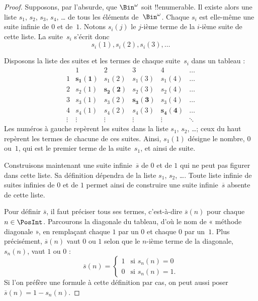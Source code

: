 \documentclass[../../../include/open-logic-section]{subfiles}
\begin{document}
\begin{proof}
Supposons, par l’absurde, que $\Bin^\omega$ soit !!{enumerable}.
Il existe alors une liste $s_{1}$, $s_{2}$, $s_{3}$, $s_{4}$, \dots{}
de tous les éléments de~$\Bin^\omega$. Chaque $s_i$ est elle-même
une suite infinie de $0$ et de~$1$. Notons $s_i(j)$ le $j$-ième terme
de la $i$-ième suite de cette liste. La suite~$s_i$ s’écrit donc
\[
s_i(1), s_i(2), s_i(3), \dots
\]

Disposons la liste des suites et les termes de chaque suite~$s_i$
dans un tableau :
\[
\begin{array}{c|c|c|c|c|c}
& 1 & 2 & 3 & 4 & \dots \\\hline
1 & \mathbf{s_{1}(1)} & s_{1}(2) & s_{1}(3) & s_1(4) & \dots \\\hline
2 & s_{2}(1)& \mathbf{s_{2}(2)} & s_2(3) & s_2(4) & \dots \\\hline
3 & s_{3}(1)& s_{3}(2) & \mathbf{s_3(3)} & s_3(4) & \dots \\\hline
4 & s_{4}(1)& s_{4}(2) & s_4(3) & \mathbf{s_4(4)} & \dots \\\hline
\vdots & \vdots & \vdots & \vdots & \vdots & \mathbf{\ddots}
\end{array}
\]
Les numéros à gauche repèrent les suites dans la liste $s_1$, $s_2$,
\dots ; ceux du haut repèrent les termes de chacune de ces suites.
Ainsi, $s_{1}(1)$ désigne le nombre, $0$ ou~$1$, qui est le premier
terme de la suite~$s_{1}$, et ainsi de suite.

Construisons maintenant une suite infinie~$\overline{s}$ de $0$
et de $1$ qui ne peut pas figurer dans cette liste. Sa définition
dépendra de la liste $s_1$, $s_2$, \dots. Toute liste infinie de
suites infinies de $0$ et de $1$ permet ainsi de construire une
suite infinie~$\overline{s}$ absente de cette liste.

Pour définir $\overline{s}$, il faut préciser tous ses termes,
c’est-à-dire $\overline{s}(n)$ pour chaque $n \in \PosInt$.
Parcourons la diagonale du tableau, d’où le nom de « méthode
diagonale », en remplaçant chaque $1$ par un $0$ et chaque $0$
par un~$1$. Plus précisément, $\overline{s}(n)$ vaut $0$ ou $1$
selon que le $n$-ième terme de la diagonale, $s_n(n)$, vaut $1$ ou $0$ :
\[
\overline{s}(n) =
\begin{cases}
1 & \text{si $s_{n}(n) = 0$}\\
0 & \text{si $s_{n}(n) = 1$}.
\end{cases}
\]
Si l’on préfère une formule à cette définition par cas, on peut
aussi poser $\overline{s}(n) = 1 - s_n(n)$.


\end{proof}
\end{document}
